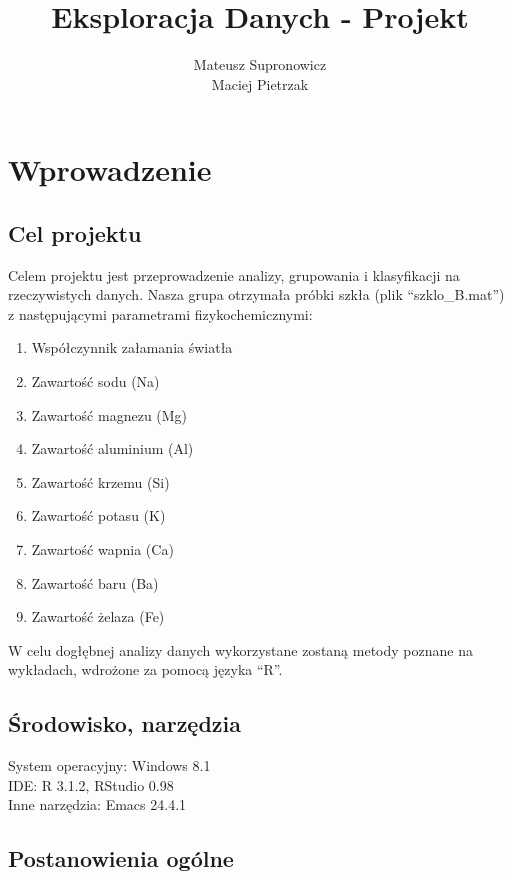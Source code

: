 \documentclass[a4paper,12pt,twoside]{article}
\title{ Eksploracja Danych - Projekt}
\author{ Mateusz Supronowicz \\ Maciej Pietrzak}
\begin{document}
\maketitle

\section{Wprowadzenie}
\bigskip


\subsection{Cel projektu}

Celem projektu jest przeprowadzenie analizy, grupowania i klasyfikacji na rzeczywistych danych.
Nasza grupa otrzymała próbki szkła (plik ``szklo\_B.mat'') z następującymi parametrami fizykochemicznymi:
\begin{enumerate}
\item Współczynnik załamania światła
\item Zawartość sodu (Na)
\item Zawartość magnezu (Mg)
\item Zawartość aluminium (Al)
\item Zawartość krzemu (Si)
\item Zawartość potasu (K)
\item Zawartość wapnia (Ca)
\item Zawartość baru (Ba)
\item Zawartość żelaza (Fe)
\end{enumerate}

W celu dogłębnej analizy danych wykorzystane zostaną metody poznane na wykładach, wdrożone za
pomocą języka ``R''.

\subsection{Środowisko, narzędzia}

System operacyjny: Windows 8.1\\
IDE: R 3.1.2, RStudio 0.98\\
Inne narzędzia: Emacs 24.4.1\\

\subsection{Postanowienia ogólne}
\end{document}
